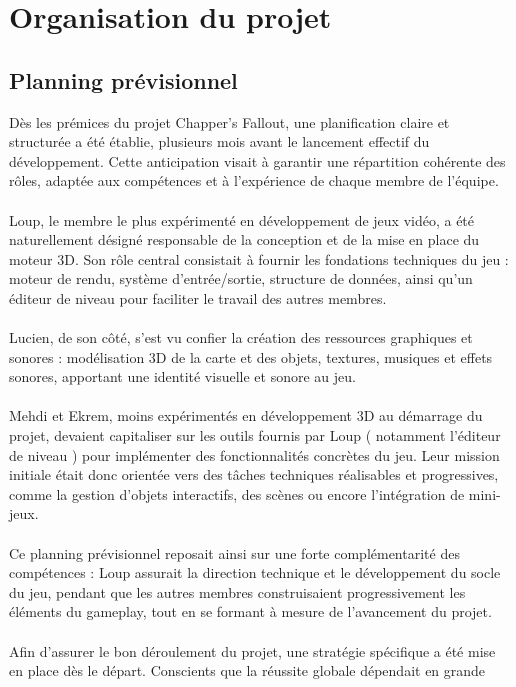 \section{Organisation du projet}
    \subsection{Planning prévisionnel}
        Dès les prémices du projet Chapper's Fallout, une planification claire et structurée a été établie, plusieurs mois avant le lancement effectif du développement. 
        Cette anticipation visait à garantir une répartition cohérente des rôles, adaptée aux compétences et à l'expérience de chaque membre de l'équipe.
        \\ \\
        Loup, le membre le plus expérimenté en développement de jeux vidéo, a été naturellement désigné responsable de la conception et de la mise en place du moteur 3D. 
        Son rôle central consistait à fournir les fondations techniques du jeu : moteur de rendu, système d’entrée/sortie, structure de données, ainsi qu’un éditeur de 
        niveau pour faciliter le travail des autres membres.
        \\ \\
        Lucien, de son côté, s’est vu confier la création des ressources graphiques et sonores : modélisation 3D de la carte et des objets, textures, musiques et effets 
        sonores, apportant une identité visuelle et sonore au jeu.
        \\ \\
        Mehdi et Ekrem, moins expérimentés en développement 3D au démarrage du projet, devaient capitaliser sur les outils fournis par Loup ( notamment l’éditeur de niveau  
        ) pour implémenter des fonctionnalités concrètes du jeu. Leur mission initiale était donc orientée vers des tâches techniques réalisables et progressives, comme la 
        gestion d’objets interactifs, des scènes ou encore l’intégration de mini-jeux.
        \\ \\
        Ce planning prévisionnel reposait ainsi sur une forte complémentarité des compétences : Loup assurait la direction technique et le développement du socle du jeu, 
        pendant que les autres membres construisaient progressivement les éléments du gameplay, tout en se formant à mesure de l’avancement du projet.
        \\ \\
        Afin d’assurer le bon déroulement du projet, une stratégie spécifique a été mise en place dès le départ. Conscients que la réussite globale dépendait en grande 
